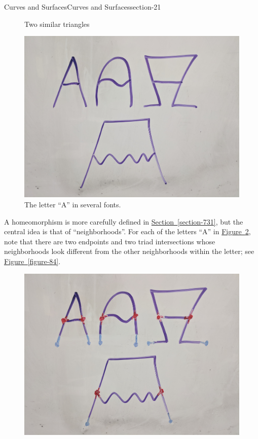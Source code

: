 \documentclass[oneside,10pt,]{article}
\begin{document}
\begin{sectionptx}{Curves and Surfaces}{}{Curves and Surfaces}{}{}{section-21}
\begin{figure}
\caption{Two similar triangles\label{figure-71}}
\end{figure}
\begin{figure}
\centering
\includegraphics[width=1\linewidth]{images/letter-a.jpg}
\caption{The letter ``A'' in several fonts.\label{figure-74}}
\end{figure}
\hypertarget{p-78}{}%
A homeomorphism is more carefully defined in \hyperref[section-731]{Section~\ref{section-731}}, but the central idea is that of ``neighborhoods''. For each of the letters ``A'' in \hyperref[figure-74]{Figure~\ref{figure-74}}, note that there are two endpoints and two triad intersections whose neighborhoods look different from the other neighborhoods within the letter; see \hyperref[figure-84]{Figure~\ref{figure-84}}.%
\begin{figure}
\centering
\includegraphics[width=1\linewidth]{images/letter-a-neighborhoods.jpg}

\end{figure}
\end{sectionptx}
\end{document}
